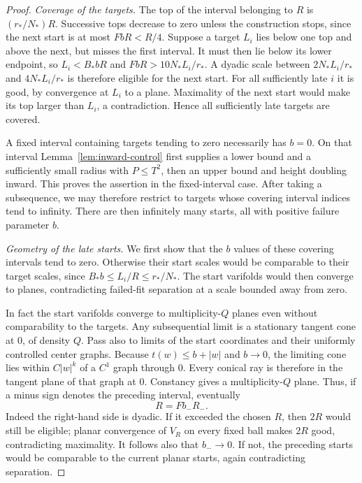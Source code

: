 \begin{proof}
\emph{Coverage of the targets.}
The top of the interval belonging to $R$ is $(r_*/N_*)R$.
Successive tops decrease to zero unless the construction stops, since
the next start is at most $FbR<R/4$. Suppose a target $L_i$ lies below
one top and above the next, but misses the first interval. It must then
lie below its lower endpoint, so $L_i<B_*bR$ and
$FbR>10N_*L_i/r_*$. A dyadic scale between
$2N_*L_i/r_*$ and $4N_*L_i/r_*$ is therefore eligible for the next
start. For all sufficiently late $i$ it is good, by convergence at
$L_i$ to a plane. Maximality of the next start would make its top
larger than $L_i$, a contradiction. Hence all sufficiently late targets
are covered.

A fixed interval containing targets tending to zero necessarily has
$b=0$. On that interval Lemma~\ref{lem:inward-control} first supplies
a lower bound and a sufficiently small radius with $P\le T^2$, then
an upper bound and height doubling inward. This proves the assertion
in the fixed-interval case. After taking a subsequence, we may therefore
restrict to targets whose covering interval indices tend to infinity.
There are then infinitely many starts, all with positive failure
parameter $b$.

\emph{Geometry of the late starts.}
We first show that the $b$ values of these covering intervals tend to
zero. Otherwise their start scales would be comparable to their target
scales, since
$B_*b\le L_i/R\le r_*/N_*$. The start varifolds would then converge
to planes, contradicting failed-fit separation at a scale bounded
away from zero.

In fact the start varifolds converge to multiplicity-$Q$ planes even
without comparability to the targets. Any subsequential limit is a
stationary tangent cone at $0$, of density $Q$. Pass also to limits of
the start coordinates and their uniformly controlled center graphs.
Because $t(w)\le b+|w|$ and $b\to0$, the limiting cone lies within
$C|w|^k$ of a $C^1$ graph through $0$. Every conical ray is therefore
in the tangent plane of that graph at $0$. Constancy gives a
multiplicity-$Q$ plane. Thus, if a minus sign denotes the preceding
interval, eventually
\begin{equation}\label{eq:exact-restart}
 R=Fb_-R_-.
\end{equation}
Indeed the right-hand side is dyadic. If it exceeded the chosen $R$,
then $2R$ would still be eligible; planar convergence of $V_R$ on
every fixed ball makes $2R$ good, contradicting maximality. It follows
also that $b_-\to0$. If not, the preceding starts would be comparable
to the current planar starts, again contradicting separation.


\end{proof}
